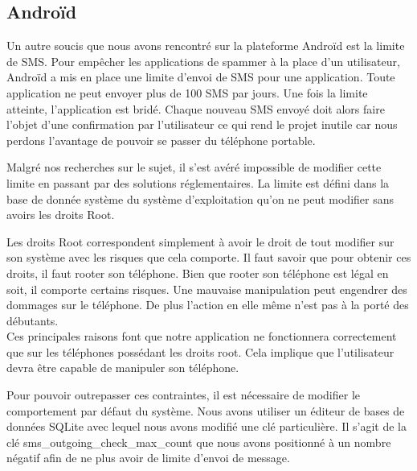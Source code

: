 \subsection{Androïd}



Un autre soucis que nous avons rencontré sur la plateforme Androïd est la limite de SMS. Pour empêcher
les applications de spammer à la place d'un utilisateur, Androïd a mis en place une limite d'envoi de 
SMS pour une application. Toute application ne peut envoyer plus de 100 SMS par jours. Une fois la limite
atteinte, l'application est bridé. Chaque nouveau SMS envoyé doit alors faire l'objet d'une confirmation
par l'utilisateur ce qui rend le projet inutile car nous perdons l'avantage de pouvoir se passer du 
téléphone portable.

Malgré nos recherches sur le sujet, il s'est avéré impossible de modifier cette limite en passant par
des solutions réglementaires. La limite est défini dans la base de donnée système du système d'exploitation
qu'on ne peut modifier sans avoirs les droits Root.

Les droits Root correspondent simplement à avoir le droit de tout modifier sur son système avec les 
risques que cela comporte. Il faut savoir que pour obtenir ces droits, il faut rooter son téléphone.
Bien que rooter son téléphone est légal en soit, il comporte certains risques. Une mauvaise manipulation
peut engendrer des dommages sur le téléphone. De plus l'action en elle même n'est pas à la porté des 
débutants.
\\


Ces principales raisons font que notre application ne fonctionnera correctement que sur les téléphones
possédant les droits root. Cela implique que l'utilisateur devra être capable de manipuler son téléphone.

Pour pouvoir outrepasser ces contraintes, il est nécessaire de modifier le comportement par défaut du 
système. Nous avons utiliser un éditeur de bases de données SQLite avec lequel nous avons modifié une clé 
particulière. Il s'agit de la clé sms\_outgoing\_check\_max\_count que nous avons positionné à un nombre négatif afin de ne plus avoir de limite d'envoi de message.

